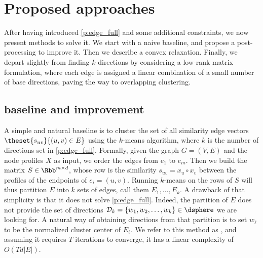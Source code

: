 

\section{Proposed approaches}
\label{sec:edge_methods}

After having introduced \autoref{p:edge_full} and some additional constraints, we now present
methods to solve it. We start with a naive baseline, and propose a post-processing to improve it.
Then we describe a convex relaxation. Finally, we depart slightly from finding $k$ directions by
considering a low-rank matrix formulation, where each edge is assigned a linear combination of a
small number of base directions, paving the way to overlapping clustering.

\subsection{\kmeans{} baseline and improvement}
\label{sub:edge_baseline}

A simple and natural baseline is to cluster the set of all similarity edge vectors $
\theset{s_{uv}}{(u,v) \in E}$ using the $k$-means algorithm, where $k$ is the number of directions
set in \autoref{p:edge_full}. Formally, given the graph $G=(V,E)$ and the node profiles $X$ as
input, we order the edges from $e_1$ to $e_m$. Then we build the matrix $S \in \Rbb^{m\times d}$, whose
\ith{} row is the similarity $s_{uv} = x_u \circ x_v$ between the profiles of the endpoints of $e_i=(u,v)$.
Running $k$-means on the rows of $S$ will thus partition $E$ into $k$ sets of edges, call them $E_1,
\ldots, E_k$. A drawback of that simplicity is that it does not solve \autoref{p:edge_full}.
Indeed, the partition of $E$ does not provide the set of directions $\mathcal{D}_k = \{w_1, w_2,
\ldots, w_k\} \in \dsphere$ we are looking for. A natural way of obtaining directions from that
partition is to set $w_\ell$ to be the normalized cluster center of $E_\ell$. We refer to this
method as \kmeans{}, and assuming it requires $T$ iterations to converge, it has a linear complexity
of $O(Td|E|)$.
\iffalse
\begin{center}
  \rule{\textwidth}{.3pt}
  \begin{algorithmic}[1]
    \Function{\kmeans{}}{graph $G=(V,E=\{e_1, \ldots, e_m \})$, profiles $X$}
    \State build the matrix $S$ such that $S_{i,j} = {s_{e_i}}_{;j}$
    \State let $\yhat{}$ and $\{c_1, \ldots, c_k\}$ be the assignment and centroids resulting of
    running $k$-means on the rows of $S$
    \State \textbf{return} \yhat{}, $\mathcal{D}_k = \left\{\frac{c_\ell}{\left\| c_\ell
    \right\|}\right\}_{\ell=1}^k $
    \EndFunction
  \end{algorithmic}
  \rule{\textwidth}{.3pt}
\end{center}
\fi

